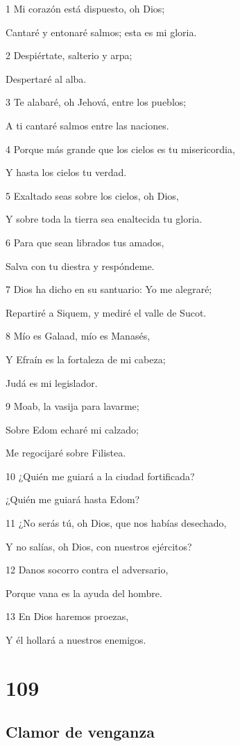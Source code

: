 \par 1 Mi corazón está dispuesto, oh Dios;
\par Cantaré y entonaré salmos; esta es mi gloria.
\par 2 Despiértate, salterio y arpa;
\par Despertaré al alba.
\par 3 Te alabaré, oh Jehová, entre los pueblos;
\par A ti cantaré salmos entre las naciones.
\par 4 Porque más grande que los cielos es tu misericordia,
\par Y hasta los cielos tu verdad.
\par 5 Exaltado seas sobre los cielos, oh Dios,
\par Y sobre toda la tierra sea enaltecida tu gloria.
\par 6 Para que sean librados tus amados,
\par Salva con tu diestra y respóndeme.
\par 7 Dios ha dicho en su santuario: Yo me alegraré;
\par Repartiré a Siquem, y mediré el valle de Sucot.
\par 8 Mío es Galaad, mío es Manasés,
\par Y Efraín es la fortaleza de mi cabeza;
\par Judá es mi legislador.
\par 9 Moab, la vasija para lavarme;
\par Sobre Edom echaré mi calzado;
\par Me regocijaré sobre Filistea.
\par 10 ¿Quién me guiará a la ciudad fortificada?
\par ¿Quién me guiará hasta Edom?
\par 11 ¿No serás tú, oh Dios, que nos habías desechado,
\par Y no salías, oh Dios, con nuestros ejércitos?
\par 12 Danos socorro contra el adversario,
\par Porque vana es la ayuda del hombre.
\par 13 En Dios haremos proezas,
\par Y él hollará a nuestros enemigos.

\chapter{109}

\section*{Clamor de venganza}


